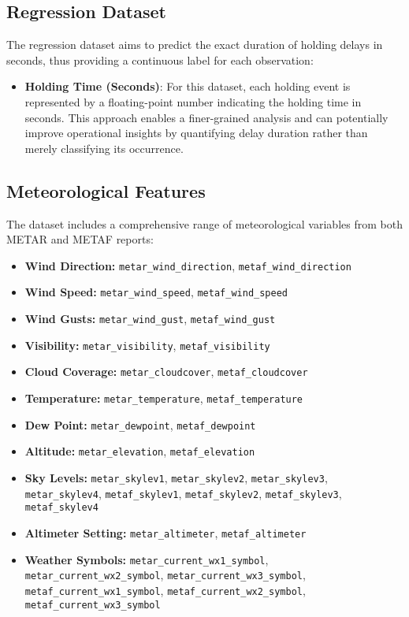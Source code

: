 \subsection{Regression Dataset} The regression dataset aims to predict
the exact duration of holding delays in seconds, thus providing a
continuous label for each observation:
\begin{itemize}
    \item \textbf{Holding Time (Seconds)}: For this dataset, each
    holding event is represented by a floating-point number indicating
    the holding time in seconds. This approach enables a finer-grained
    analysis and can potentially improve operational insights by
    quantifying delay duration rather than merely classifying its
    occurrence.
\end{itemize}


\subsection{Meteorological Features} The dataset includes a
comprehensive range of meteorological variables from both METAR and
METAF reports:

\begin{itemize}
    \item \textbf{Wind Direction:} \texttt{metar\_wind\_direction},
    \texttt{metaf\_wind\_direction}
    \item \textbf{Wind Speed:} \texttt{metar\_wind\_speed},
    \texttt{metaf\_wind\_speed}
    \item \textbf{Wind Gusts:} \texttt{metar\_wind\_gust},
    \texttt{metaf\_wind\_gust}
    \item \textbf{Visibility:} \texttt{metar\_visibility},
    \texttt{metaf\_visibility}
    \item \textbf{Cloud Coverage:} \texttt{metar\_cloudcover},
    \texttt{metaf\_cloudcover}
    \item \textbf{Temperature:} \texttt{metar\_temperature},
    \texttt{metaf\_temperature}
    \item \textbf{Dew Point:} \texttt{metar\_dewpoint},
    \texttt{metaf\_dewpoint}
    \item \textbf{Altitude:} \texttt{metar\_elevation},
    \texttt{metaf\_elevation}
    \item \textbf{Sky Levels:} \texttt{metar\_skylev1},
    \texttt{metar\_skylev2}, \texttt{metar\_skylev3},
    \texttt{metar\_skylev4}, \texttt{metaf\_skylev1},
    \texttt{metaf\_skylev2}, \texttt{metaf\_skylev3},
    \texttt{metaf\_skylev4}
    \item \textbf{Altimeter Setting:} \texttt{metar\_altimeter},
    \texttt{metaf\_altimeter}
    \item \textbf{Weather Symbols:}
    \texttt{metar\_current\_wx1\_symbol},
    \texttt{metar\_current\_wx2\_symbol},
    \texttt{metar\_current\_wx3\_symbol},
    \texttt{metaf\_current\_wx1\_symbol},
    \texttt{metaf\_current\_wx2\_symbol},
    \texttt{metaf\_current\_wx3\_symbol}
\end{itemize}


